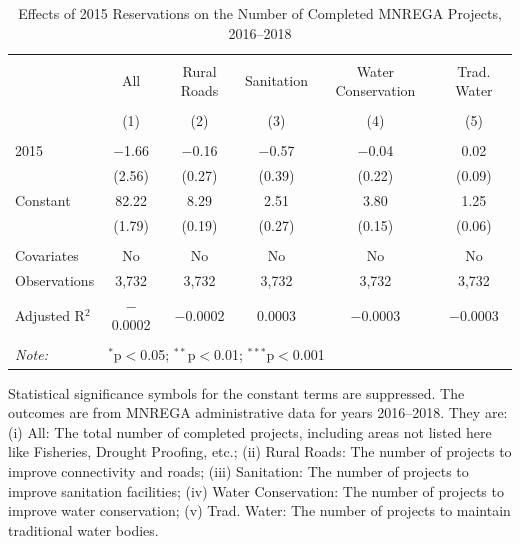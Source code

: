 \begin{table}[!htbp]
\centering
\begin{threeparttable}

  \caption{Effects of 2015 Reservations on the Number of Completed MNREGA Projects, 2016--2018} 
  \label{main_mnrega_15} 
\scriptsize 
\begin{tabular}{@{\extracolsep{0pt}}lccccc} 
\\[-1.8ex]\hline 
\hline \\[-1.8ex] 
 & All & Rural Roads & Sanitation & Water Conservation & Trad. Water \\ 
\\[-1.8ex] & (1) & (2) & (3) & (4) & (5)\\ 
\hline \\[-1.8ex] 
 2015 & $-$1.66 & $-$0.16 & $-$0.57 & $-$0.04 & 0.02 \\ 
  & (2.56) & (0.27) & (0.39) & (0.22) & (0.09) \\ 
  Constant & 82.22 & 8.29 & 2.51 & 3.80 & 1.25 \\ 
  & (1.79) & (0.19) & (0.27) & (0.15) & (0.06) \\ 
 \hline \\[-1.8ex] 
Covariates & No & No & No & No & No \\ 
Observations & 3,732 & 3,732 & 3,732 & 3,732 & 3,732 \\ 
Adjusted R$^{2}$ & $-$0.0002 & $-$0.0002 & 0.0003 & $-$0.0003 & $-$0.0003 \\ 
\hline 
\hline \\[-1.8ex] 
\textit{Note:}  & \multicolumn{5}{l}{$^{*}$p$<$0.05; $^{**}$p$<$0.01; $^{***}$p$<$0.001} \\ 
\end{tabular} 
\begin{tablenotes}[flushleft]
\scriptsize
\item[] Statistical significance symbols for the constant terms are suppressed. The outcomes are from MNREGA administrative data for years 2016--2018. They are: 
(i) All: The total number of completed projects, including areas not listed here like Fisheries, Drought Proofing, etc.;
(ii) Rural Roads: The number of projects to improve connectivity and roads;
(iii) Sanitation: The number of projects to improve sanitation facilities;
(iv) Water Conservation: The number of projects to improve water conservation;
(v) Trad. Water: The number of projects to maintain traditional water bodies.
\end{tablenotes}
\end{threeparttable}
\end{table}
